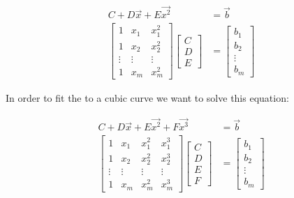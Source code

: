 \documentclass[12pt,letterpaper]{article}
\begin{document}
\begin{enumerate}
      \begin{align*}
        C + D\vec{x} + E\vec{x^2} &= \vec{b} \\
        \begin{bmatrix}
          1 & x_1 & x_1^2 \\
          1 & x_2 & x_2^2 \\
          \vdots & \vdots & \vdots \\
          1 & x_m & x_m^2
        \end{bmatrix}
        \begin{bmatrix}
          C \\
          D \\
          E
        \end{bmatrix}
        &=
        \begin{bmatrix}
          b_1 \\
          b_2 \\
          \vdots \\
          b_m
        \end{bmatrix}
      \end{align*}

      \pagebreak

      In order to fit the to a cubic curve we want to solve this equation:

      \begin{align*}
        C + D\vec{x} + E\vec{x^2} + F\vec{x^3} &= \vec{b} \\
        \begin{bmatrix}
          1 & x_1 & x_1^2 & x_1^3 \\
          1 & x_2 & x_2^2 & x_2^3 \\
          \vdots & \vdots & \vdots & \vdots \\
          1 & x_m & x_m^2 & x_m^3
        \end{bmatrix}
        \begin{bmatrix}
          C \\
          D \\
          E \\
          F
        \end{bmatrix}
        &=
        \begin{bmatrix}
          b_1 \\
          b_2 \\
          \vdots \\
          b_m
        \end{bmatrix}
      \end{align*}
  \end{enumerate}
\end{document}
